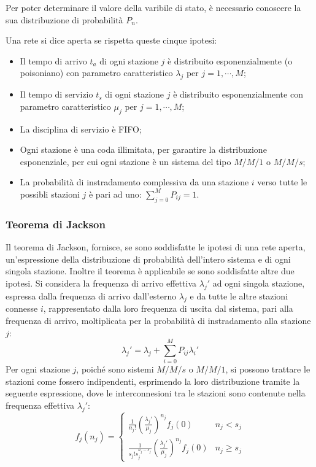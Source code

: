 \documentclass{article}
\numberwithin{equation}{subsection}
\begin{document}
Per poter determinare il valore della varibile di stato, è necessario conoscere la sua distribuzione di probabilità $P_n$. 

Una rete si dice aperta se rispetta queste cinque ipotesi:
\begin{itemize}
    \item Il tempo di arrivo $t_a$ di ogni stazione $j$ è distribuito esponenzialmente (o poisoniano) con parametro caratteristico $\lambda_j$ per $j=1,\cdots,M$;
    \item Il tempo di servizio $t_s$ di ogni stazione $j$ è distribuito esponenzialmente con parametro caratteristico $\mu_j$ per $j=1,\cdots, M$;
    \item La disciplina di servizio è FIFO;
    \item Ogni stazione è una coda illimitata, per garantire la distribuzione esponenziale, per cui ogni stazione è un sistema del tipo $M/M/1$ o $M/M/s$;
    \item La probabilità di instradamento complessiva da una stazione $i$ verso tutte le possibli stazioni $j$ è pari ad uno: $\displaystyle\sum_{j=0}^{M}P_{ij}=1$.
\end{itemize} 

\subsubsection{Teorema di Jackson}

Il teorema di Jackson, fornisce, se sono soddisfatte le ipotesi di una rete aperta, un'espressione della distribuzione di probabilità dell'intero sistema e di ogni singola 
stazione. 
Inoltre il teorema è applicabile se sono soddisfatte altre due ipotesi. 
Si considera la frequenza di arrivo effettiva $\lambda_j'$ ad ogni singola stazione, espressa dalla frequenza di arrivo dall'esterno $\lambda_j$ e da tutte le altre stazioni 
connesse $i$, rappresentato dalla loro frequenza di uscita dal sistema, pari alla frequenza di arrivo, moltiplicata per la probabilità di instradamento alla stazione $j$:
\begin{equation}
    \lambda_j'=\lambda_j+\displaystyle\sum_{i=0}^{M}P_{ij}\lambda_i'
\end{equation}
Per ogni stazione $j$, poiché sono sistemi $M/M/s$ o $M/M/1$, si possono trattare le stazioni come fossero indipendenti, esprimendo la loro distribuzione tramite 
la seguente espressione, dove le interconnesioni tra le stazioni sono contenute nella frequenza effettiva $\lambda_j'$: 
\begin{equation}
    f_j(n_j)=\begin{cases}
        \displaystyle\frac{1}{n_j!}\left(\frac{\lambda_j'}{\mu_j}\right)^{n_j}f_j(0)&n_j<s_j\\
        \displaystyle\frac{1}{s_j!s_j^{n_j-s_j}}\left(\frac{\lambda_j'}{\mu_j}\right)^{n_j}f_j(0)&n_j\geq s_j
    \end{cases}
\end{equation}
\end{document}
